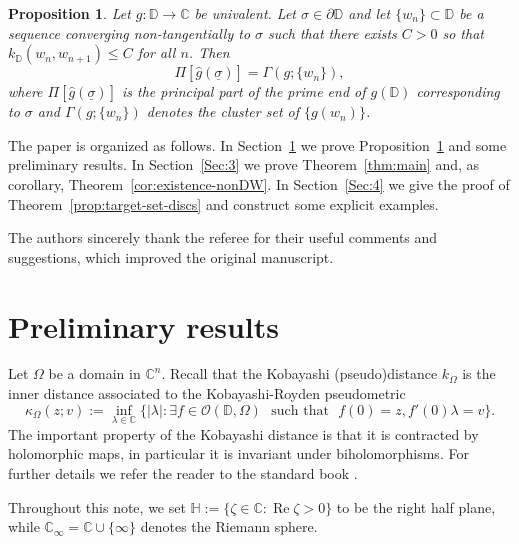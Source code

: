 \documentclass[12pt]{amsart}
\newtheorem{proposition}[theorem]{Proposition}
\theoremstyle{definition}
\theoremstyle{remark}
\numberwithin{equation}{section}
\def\C{\mathbb C}
\def\D{\mathbb D}
\def\Ha{\mathbb H}
\renewcommand{\Re}{\operatorname{Re}}
\begin{document}
\begin{proposition}\label{Prop:Lehto-NT-simpl}
Let $g:\D\to \C$ be univalent. Let $\sigma\in \partial \D$ and let $\{w_n\}\subset\D$ be a sequence converging non-tangentially to $\sigma$ such that there exists $C>0$ so that $k_\D(w_n,w_{n+1})\leq C$ for all $n$. Then
\[
\Pi[\hat{g}(\underline{\sigma})]=\Gamma(g;\{w_n\}),
\]
where $\Pi[\hat{g}(\underline{\sigma})]$ is the principal part of the prime end of $g(\D)$ corresponding to $\sigma$ and $\Gamma(g;\{w_n\})$ denotes the cluster set of $\{g(w_n)\}$.
\end{proposition}

The paper is organized as follows. In Section~\ref{Sec:uno} we prove Proposition~\ref{Prop:Lehto-NT-simpl} and some preliminary results. In Section~\ref{Sec:3} we prove Theorem~\ref{thm:main} and, as corollary, Theorem~\ref{cor:existence-nonDW}. In Section~\ref{Sec:4} we give the proof of Theorem~\ref{prop:target-set-discs} and construct some explicit examples.

\medskip

The authors sincerely thank the referee for their useful comments and suggestions, which improved the original manuscript.


\section{Preliminary results}\label{Sec:uno}


Let $\Omega$ be a domain in $\mathbb C^n$. Recall that the Kobayashi (pseudo)distance $k_\Omega$ is the inner distance associated to the Kobayashi-Royden pseudometric 
$$ \kappa_\Omega(z;v):=\inf_{\lambda \in \mathbb C}\{|\lambda|: \exists f \in \mathcal{O}(\D,\Omega) \:\:\: \text{such that} \:\:\: f(0)=z, f'(0)\lambda=v\}.$$ The important property of the Kobayashi distance is that it is contracted by holomorphic maps, in particular it is invariant under biholomorphisms. For further details we refer the reader to the standard book \cite{JP}.


Throughout this note, we set $\Ha:=\{\zeta\in\C: \Re \zeta>0\}$ to be the right half plane, while $\C_\infty=\C\cup \{\infty\}$ denotes the Riemann sphere.
\end{document}
